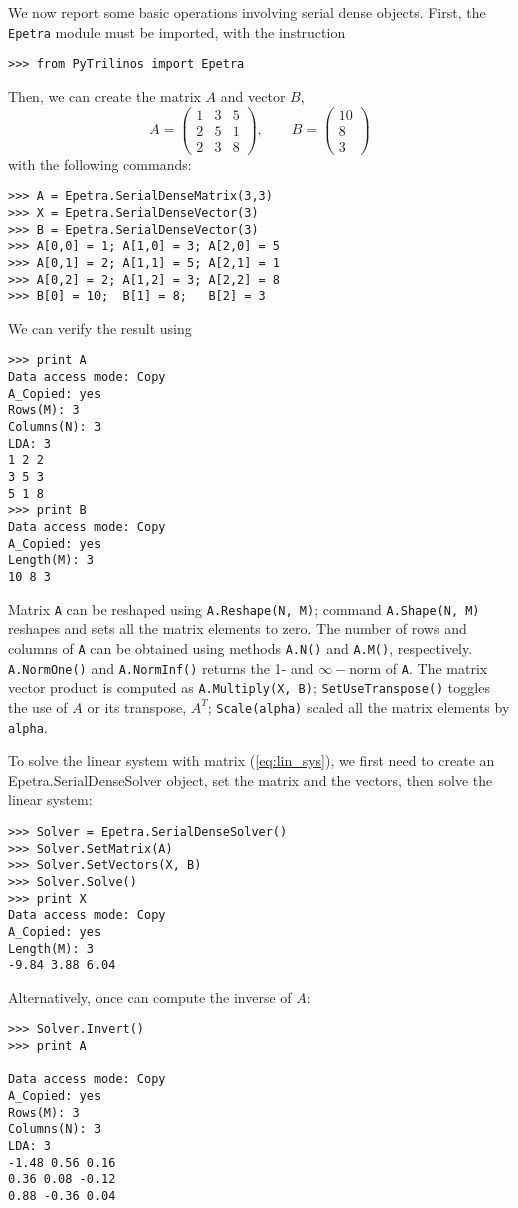 \documentclass[10pt,relax]{SANDreport}
\begin{document}
We now report some basic operations involving serial dense objects. First, 
the {\tt Epetra} module must be imported, with the instruction
\begin{verbatim}
>>> from PyTrilinos import Epetra
\end{verbatim}
Then, we can create the matrix $A$ and vector $B$,
\[
A = 
\begin{pmatrix}
1 & 3 & 5 \\
2 & 5 & 1 \\
2 & 3 & 8
\end{pmatrix}
, \quad \quad
B = 
\begin{pmatrix}
10 \\
  8 \\
  3
\end{pmatrix}
\]
with the following commands:
\begin{verbatim}
>>> A = Epetra.SerialDenseMatrix(3,3)
>>> X = Epetra.SerialDenseVector(3)
>>> B = Epetra.SerialDenseVector(3)
>>> A[0,0] = 1; A[1,0] = 3; A[2,0] = 5
>>> A[0,1] = 2; A[1,1] = 5; A[2,1] = 1
>>> A[0,2] = 2; A[1,2] = 3; A[2,2] = 8
>>> B[0] = 10;  B[1] = 8;   B[2] = 3
\end{verbatim}
We can  verify the result using 
\begin{verbatim}
>>> print A
Data access mode: Copy
A_Copied: yes
Rows(M): 3
Columns(N): 3
LDA: 3
1 2 2 
3 5 3 
5 1 8 
>>> print B
Data access mode: Copy
A_Copied: yes
Length(M): 3
10 8 3 
\end{verbatim}
Matrix {\tt A} can be reshaped using \verb!A.Reshape(N, M)!; command
\verb!A.Shape(N, M)! reshapes and sets all the matrix elements to zero.  The
number of rows and columns of {\tt A} can be obtained using methods
\verb!A.N()! and \verb!A.M()!, respectively. \verb!A.NormOne()! and
\verb!A.NormInf()!  returns the 1- and $\infty-$norm of {\tt A}. The matrix
vector product is computed as \verb!A.Multiply(X, B)!;
\verb!SetUseTranspose()! toggles the use of $A$ or its transpose, $A^T$;
\verb!Scale(alpha)! scaled all the matrix elements by \verb!alpha!.

To solve the linear system with matrix (\ref{eq:lin_sys}), we first need to
create an Epetra.SerialDenseSolver object, set the matrix and the vectors,
  then solve the linear system:
\begin{verbatim}
>>> Solver = Epetra.SerialDenseSolver()
>>> Solver.SetMatrix(A)
>>> Solver.SetVectors(X, B)
>>> Solver.Solve()
>>> print X
Data access mode: Copy
A_Copied: yes
Length(M): 3
-9.84 3.88 6.04 
\end{verbatim}
Alternatively, once can compute the inverse of $A$:
\begin{verbatim}
>>> Solver.Invert()
>>> print A

Data access mode: Copy
A_Copied: yes
Rows(M): 3
Columns(N): 3
LDA: 3
-1.48 0.56 0.16 
0.36 0.08 -0.12 
0.88 -0.36 0.04 
\end{verbatim}
\end{document}
